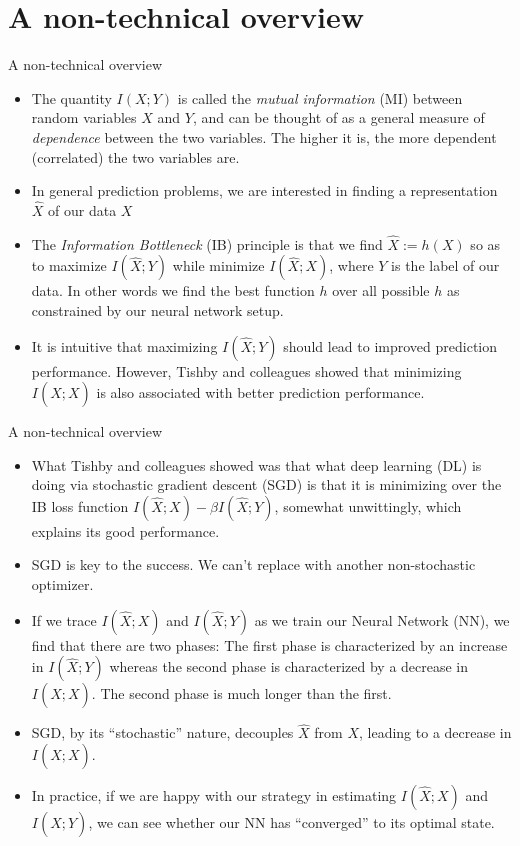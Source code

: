 \documentclass{beamer}
\begin{document}
\section{A non-technical overview}
\begin{frame}{A non-technical overview}
\begin{itemize}
	\item The quantity $I(X;Y)$ is called the \emph{mutual information} (MI) between random variables $X$ and $Y$, and can be thought of as a general measure of \emph{dependence} between the two variables. The higher it is, the more dependent (correlated) the two variables are. 
	\item In general prediction problems, we are interested in finding a representation $\hat{X}$ of our data $X$ 
	\item The \emph{Information Bottleneck} (IB) principle is that we find $\hat{X} := h(X)$ so as to maximize $I(\hat{X};Y)$ while minimize $I(\hat{X};X)$, where $Y$ is the label of our data. In other words we find the best function $h$ over all possible $h$ as constrained by our neural network setup. 
	\item It is intuitive that maximizing $I(\hat{X};Y)$ should lead to improved prediction performance. However, Tishby and colleagues showed that minimizing $I(\hat{X};X)$ is also associated with better prediction performance. 
\end{itemize}
\end{frame}

\begin{frame}{A non-technical overview}
\begin{itemize}
	\item What Tishby and colleagues showed was that what deep learning (DL) is doing via stochastic gradient descent (SGD) is that it is minimizing over the IB loss function $I(\hat{X};X) - \beta I(\hat{X};Y)$, somewhat unwittingly, which explains its good performance.
	\item SGD is key to the success. We can't replace with another non-stochastic optimizer. 
	\item If we trace $I(\hat{X};X)$ and $I(\hat{X};Y)$ as we train our Neural Network (NN), we find that there are two phases: The first phase is characterized by an increase in $I(\hat{X};Y)$ whereas the second phase is characterized by a decrease in $I(\hat{X};X)$. The second phase is much longer than the first. 
	\item SGD, by its ``stochastic'' nature, decouples $\hat{X}$ from $X$, leading to a decrease in $I(\hat{X};X)$. 
	\item In practice, if we are happy with our strategy in estimating $I(\hat{X};X)$ and $I(\hat{X};Y)$, we can see whether our NN has ``converged'' to its optimal state. 
\end{itemize}
\end{frame}
\end{document}
